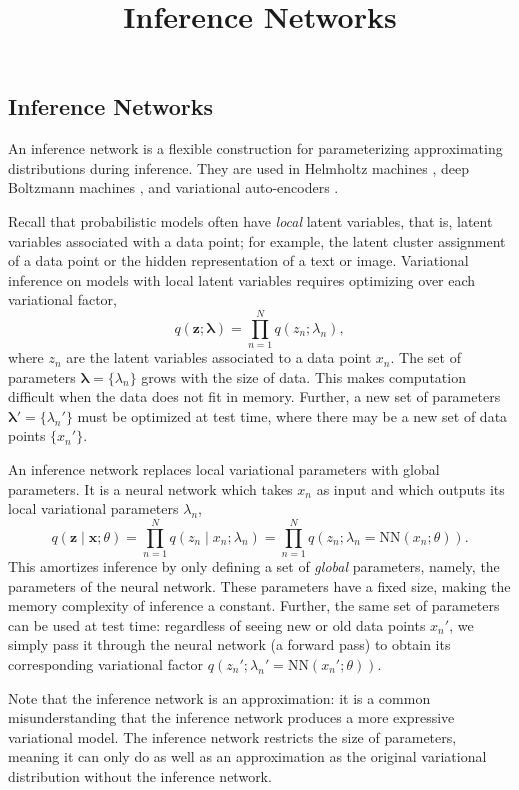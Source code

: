\title{Inference Networks}

\subsection{Inference Networks}

An inference network is a flexible construction for parameterizing
approximating distributions during inference.
They are used in Helmholtz machines \citep{dayan1995helmholtz}, deep
Boltzmann machines \citep{salakhutdinov2010efficient}, and
variational auto-encoders \citep{kingma2014auto,rezende2014stochastic}.

Recall that probabilistic models often have \emph{local} latent
variables, that is, latent variables associated with a data point; for
example, the latent cluster assignment of a data point or the hidden
representation of a text or image.
Variational
inference on models with local latent variables
requires optimizing over each variational factor,
\begin{equation*}
q(\mathbf{z}; \mathbf{\lambda}) = \prod_{n=1}^N q(z_n; \lambda_n),
\end{equation*}
where $z_n$ are the latent variables associated to a data point $x_n$.
The set of parameters $\mathbf{\lambda}=\{\lambda_n\}$ grows with the
size of data. This makes computation difficult when the data
does not fit in memory.
Further, a new set of parameters $\mathbf{\lambda}'=\{\lambda_n'\}$
must be optimized at test time, where there may be a new set of data
points $\{x_n'\}$.

An inference network replaces local variational parameters with global
parameters. It is a neural network
which takes $x_n$ as input and which outputs its local variational parameters
$\lambda_n$,
\begin{equation*}
q(\mathbf{z}\mid \mathbf{x}; \theta)
= \prod_{n=1}^N q(z_n \mid x_n; \lambda_n)
= \prod_{n=1}^N q(z_n; \lambda_n = \mathrm{NN}(x_n; \theta)).
\end{equation*}
This amortizes inference by only defining a set of \emph{global} parameters,
namely, the parameters of the neural network. These parameters have a
fixed size, making the memory complexity of inference a constant.
Further, the same set of parameters can be used at test time:
regardless of seeing new or old data points $x_n'$, we simply pass it
through the neural network (a forward pass) to obtain its
corresponding variational factor $q(z_n'; \lambda_n' =
\mathrm{NN}(x_n'; \theta))$.

Note that the inference network is an approximation: it is a common
misunderstanding that the inference network produces a more expressive
variational model. The inference network restricts the size of
parameters, meaning it can only do as well as an approximation as the
original variational distribution without the inference network.

